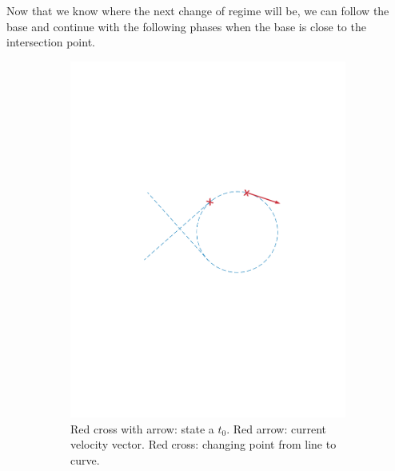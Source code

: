 Now that we know where the next change of regime will be, we can follow the base and continue with the following phases when the base is close to the intersection point.

\begin{figure}[!htbp]
  \centering
   \begin{subfigure}[b]{0.45\textwidth}
        \includegraphics[width=\textwidth]{img/intersection_1.pdf}
        \caption{Red cross with arrow: state a $t_0$. Red arrow: current velocity vector. Red cross: changing point from line to curve.}
        \label{fig:one}
   \end{subfigure}\hfill
   \begin{subfigure}[b]{0.45\textwidth}

\end{subfigure}
\end{figure}
